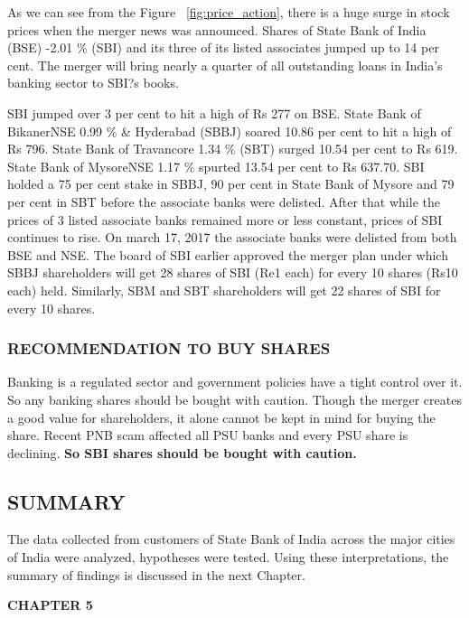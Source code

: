 \documentclass[a4paper, 12pt]{extarticle}
\begin{document}
{\par As we can see from the Figure ~\ref{fig:price_action}, there is a huge surge in stock prices when the merger news was announced. Shares of State Bank of India (BSE) -2.01 \% (SBI) and its three of its listed associates jumped up to 14 per cent. The merger will bring nearly a quarter of all outstanding loans in India's banking sector to SBI?s books.

SBI jumped over 3 per cent to hit a high of Rs 277 on BSE. State Bank of BikanerNSE 0.99 \% \& Hyderabad (SBBJ) soared 10.86 per cent to hit a high of Rs 796. State Bank of Travancore 1.34 \% (SBT) surged 10.54 per cent to Rs 619. State Bank of MysoreNSE 1.17 \% spurted 13.54 per cent to Rs 637.70. SBI holded a 75 per cent stake in SBBJ, 90 per cent in State Bank of Mysore and 79 per cent in SBT before the associate banks were delisted. After that while the prices of 3 listed associate banks remained more or less constant, prices of SBI continues to rise. On march 17, 2017 the associate banks were delisted from both BSE and NSE. The board of SBI earlier approved the merger plan under which SBBJ shareholders will get 28 shares of SBI (Re1 each) for every 10 shares (Rs10 each) held. Similarly, SBM and SBT shareholders will get 22 shares of SBI for every 10 shares.

\subsubsection{RECOMMENDATION TO BUY SHARES}
\par Banking is a regulated sector and government policies have a tight control over it. So any banking shares should be bought with caution. Though the merger creates a good value for shareholders, it alone cannot be kept in mind for buying the share. Recent PNB scam affected all PSU banks and every PSU share is declining. \textbf{So SBI shares should be bought with caution.}

\subsection{SUMMARY}

The data collected from customers of State Bank of India across the major cities of India were analyzed, hypotheses were tested. Using these interpretations, the summary of findings is discussed in the next Chapter.

\newpage
\begin{center}
\textbf{\large CHAPTER 5}
\end{center}
}
\end{document}
